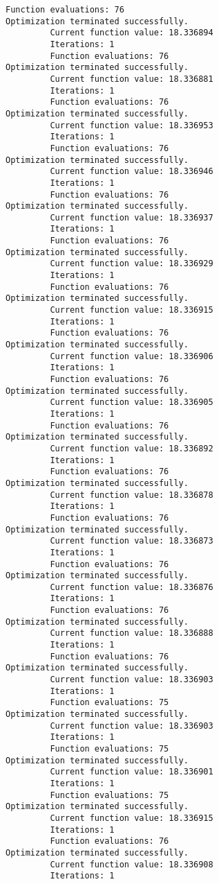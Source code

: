 \documentclass[11pt]{article}
\begin{document}
\begin{Verbatim}[commandchars=\\\{\}]
         Function evaluations: 76
Optimization terminated successfully.
         Current function value: 18.336894
         Iterations: 1
         Function evaluations: 76
Optimization terminated successfully.
         Current function value: 18.336881
         Iterations: 1
         Function evaluations: 76
Optimization terminated successfully.
         Current function value: 18.336953
         Iterations: 1
         Function evaluations: 76
Optimization terminated successfully.
         Current function value: 18.336946
         Iterations: 1
         Function evaluations: 76
Optimization terminated successfully.
         Current function value: 18.336937
         Iterations: 1
         Function evaluations: 76
Optimization terminated successfully.
         Current function value: 18.336929
         Iterations: 1
         Function evaluations: 76
Optimization terminated successfully.
         Current function value: 18.336915
         Iterations: 1
         Function evaluations: 76
Optimization terminated successfully.
         Current function value: 18.336906
         Iterations: 1
         Function evaluations: 76
Optimization terminated successfully.
         Current function value: 18.336905
         Iterations: 1
         Function evaluations: 76
Optimization terminated successfully.
         Current function value: 18.336892
         Iterations: 1
         Function evaluations: 76
Optimization terminated successfully.
         Current function value: 18.336878
         Iterations: 1
         Function evaluations: 76
Optimization terminated successfully.
         Current function value: 18.336873
         Iterations: 1
         Function evaluations: 76
Optimization terminated successfully.
         Current function value: 18.336876
         Iterations: 1
         Function evaluations: 76
Optimization terminated successfully.
         Current function value: 18.336888
         Iterations: 1
         Function evaluations: 76
Optimization terminated successfully.
         Current function value: 18.336903
         Iterations: 1
         Function evaluations: 75
Optimization terminated successfully.
         Current function value: 18.336903
         Iterations: 1
         Function evaluations: 75
Optimization terminated successfully.
         Current function value: 18.336901
         Iterations: 1
         Function evaluations: 75
Optimization terminated successfully.
         Current function value: 18.336915
         Iterations: 1
         Function evaluations: 76
Optimization terminated successfully.
         Current function value: 18.336908
         Iterations: 1

\end{Verbatim}
\end{document}
